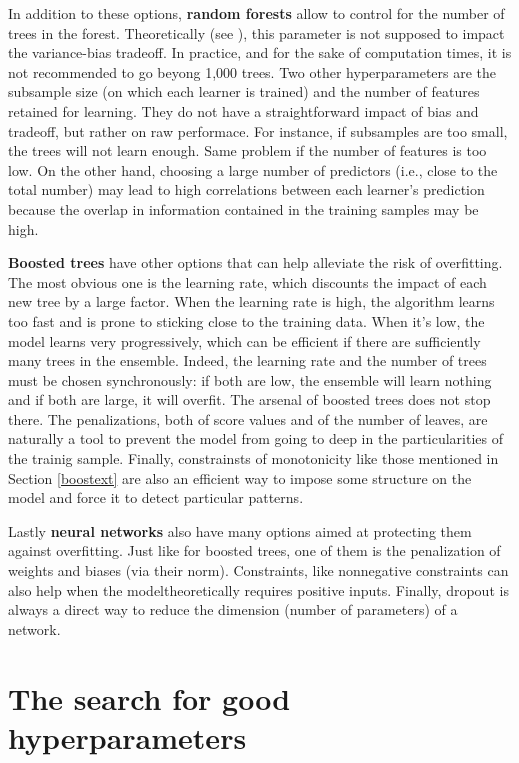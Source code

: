 \documentclass[]{krantz}
\theoremstyle{definition}
\theoremstyle{definition}
\theoremstyle{definition}
\theoremstyle{remark}
\begin{document}
In addition to these options, \textbf{random forests} allow to control
for the number of trees in the forest. Theoretically (see
\citet{breiman2001random}), this parameter is not supposed to impact the
variance-bias tradeoff. In practice, and for the sake of computation
times, it is not recommended to go beyong 1,000 trees. Two other
hyperparameters are the subsample size (on which each learner is
trained) and the number of features retained for learning. They do not
have a straightforward impact of bias and tradeoff, but rather on raw
performace. For instance, if subsamples are too small, the trees will
not learn enough. Same problem if the number of features is too low. On
the other hand, choosing a large number of predictors (i.e., close to
the total number) may lead to high correlations between each learner's
prediction because the overlap in information contained in the training
samples may be high.

\textbf{Boosted trees} have other options that can help alleviate the
risk of overfitting. The most obvious one is the learning rate, which
discounts the impact of each new tree by a large factor. When the
learning rate is high, the algorithm learns too fast and is prone to
sticking close to the training data. When it's low, the model learns
very progressively, which can be efficient if there are sufficiently
many trees in the ensemble. Indeed, the learning rate and the number of
trees must be chosen synchronously: if both are low, the ensemble will
learn nothing and if both are large, it will overfit. The arsenal of
boosted trees does not stop there. The penalizations, both of score
values and of the number of leaves, are naturally a tool to prevent the
model from going to deep in the particularities of the trainig sample.
Finally, constrainsts of monotonicity like those mentioned in Section
\ref{boostext} are also an efficient way to impose some structure on the
model and force it to detect particular patterns.

Lastly \textbf{neural networks} also have many options aimed at
protecting them against overfitting. Just like for boosted trees, one of
them is the penalization of weights and biases (via their norm).
Constraints, like nonnegative constraints can also help when the
modeltheoretically requires positive inputs. Finally, dropout is always
a direct way to reduce the dimension (number of parameters) of a
network.

\hypertarget{the-search-for-good-hyperparameters}{%
\section{The search for good
hyperparameters}\label{the-search-for-good-hyperparameters}}
\end{document}
